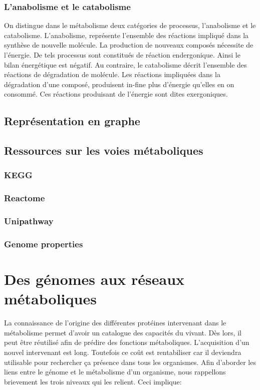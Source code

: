 \begin{refsection}
    
    \subsubsection{L'anabolisme et le catabolisme}
    On distingue dans le métabolisme deux catégories de processus, l'anabolisme et le catabolisme. L'anabolisme, représente l'ensemble des réactions impliqué dans la synthèse de nouvelle molécule. La production de nouveaux composés nécessite de l'énergie. De tels processus sont constitués de réaction endergonique. Ainsi le bilan énergétique est négatif.  Au contraire, le catabolisme décrit l'ensemble des réactions de dégradation de molécule. Les réactions impliquées dans la dégradation d'une composé, produisent in-fine plus d'énergie qu'elles en on consommé. Ces réactions produisant de l'énergie sont dites exergoniques.
    
    \subsection{Représentation en graphe}
    \subsection{Ressources sur les voies métaboliques}
    \subsubsection{KEGG}
    \subsubsection{Reactome}
    \subsubsection{Unipathway}
    \subsubsection{Genome properties}
    
    \section{Des génomes aux réseaux métaboliques}
    
    La connaissance de l'origine des différentes protéines intervenant dans le métabolisme permet d'avoir un catalogue des capacités du vivant. Dès lors, il peut être réutilisé afin de prédire des fonctions métaboliques. L'acquisition d'un nouvel intervenant est long. Toutefois ce coût est rentabiliser car il deviendra utilisable pour rechercher ça présence dans tous les organismes. Afin d'aborder les liens entre le génome et le métabolisme d'un organisme, nous rappellons brievement les trois niveaux qui les relient. Ceci implique:
    

\end{refsection}
